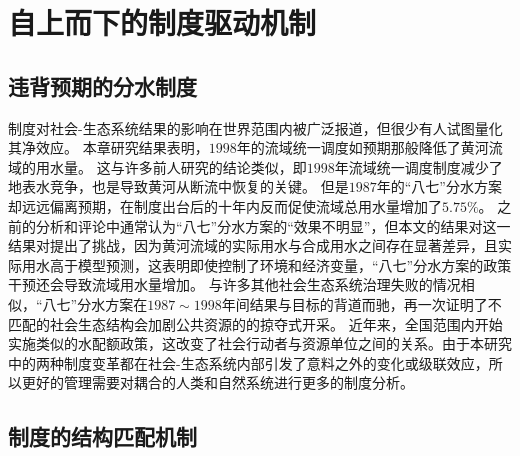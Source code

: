 \section{自上而下的制度驱动机制}

\subsection{违背预期的分水制度}

制度对社会-生态系统结果的影响在世界范围内被广泛报道，但很少有人试图量化其净效应\cite{cumming2020a}。
本章研究结果表明，$1998$年的流域统一调度如预期那般降低了黄河流域的用水量。
这与许多前人研究的结论类似，即$1998$年流域统一调度制度减少了地表水竞争，也是导致黄河从断流中恢复的关键\cite{chen2021,huangang2002,an2007}。
但是$1987$年的“八七”分水方案却远远偏离预期，在制度出台后的十年内反而促使流域总用水量增加了$5.75\%$。
之前的分析和评论中通常认为“八七”分水方案的“效果不明显”，但本文的结果对这一结果对提出了挑战，因为黄河流域的实际用水与合成用水之间存在显著差异，且实际用水高于模型预测\cite{abadie2015,hill2021}，这表明即使控制了环境和经济变量，“八七”分水方案的政策干预还会导致流域用水量增加。
与许多其他社会生态系统治理失败的情况相似，“八七”分水方案在$1987 \sim 1998$年间结果与目标的背道而驰，再一次证明了不匹配的社会生态结构会加剧公共资源的的掠夺式开采\cite{kellenberg2009,cai2016,barnes2019}。
近年来，全国范围内开始实施类似的水配额政策，这改变了社会行动者与资源单位之间的关系。由于本研究中的两种制度变革都在社会-生态系统内部引发了意料之外的变化或级联效应，所以更好的管理需要对耦合的人类和自然系统进行更多的制度分析。

%
\subsection{制度的结构匹配机制}

